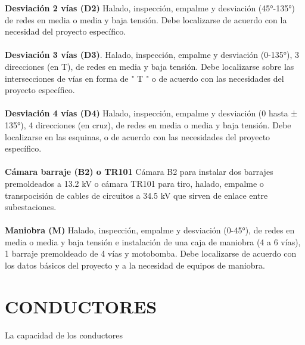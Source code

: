 \documentclass[a5paper]{book}%
\begin{document}
\textbf{Desviación 2 vías (D2)} Halado, inspección, empalme y desviación (45°-135°) de redes en media o media y baja tensión. Debe localizarse de acuerdo con la necesidad del proyecto específico.\\\\

\textbf{Desviación 3 vías (D3)}.
Halado, inspección, empalme y desviación (0-135°), 3 direcciones (en T), de redes en media y baja tensión. Debe localizarse sobre las intersecciones de vías en forma de " T " o de acuerdo con las necesidades del proyecto específico.\\\\
\textbf{Desviación 4 vías (D4)}
Halado, inspección, empalme y desviación (0 hasta ± 135°), 4 direcciones (en cruz), de redes en media o media y baja tensión. Debe localizarse en las esquinas,  o de acuerdo con las necesidades del proyecto específico.\\\\
\textbf{Cámara barraje (B2) o TR101}
Cámara B2 para instalar dos barrajes premoldeados a 13.2 kV o cámara TR101 para tiro, halado, empalme o transpocisión de cables de circuitos a 34.5 kV que sirven de enlace entre subestaciones.\\\\
\textbf{Maniobra (M)}
Halado, inspección, empalme y desviación (0-45°), de redes en media o media y baja tensión e instalación de una caja de maniobra (4 a 6 vías), 1 barraje premoldeado de 4 vías y motobomba. Debe localizarse de acuerdo con los datos básicos del proyecto y a la necesidad de equipos de maniobra.

\section{CONDUCTORES}

La capacidad de los conductores
\end{document}
